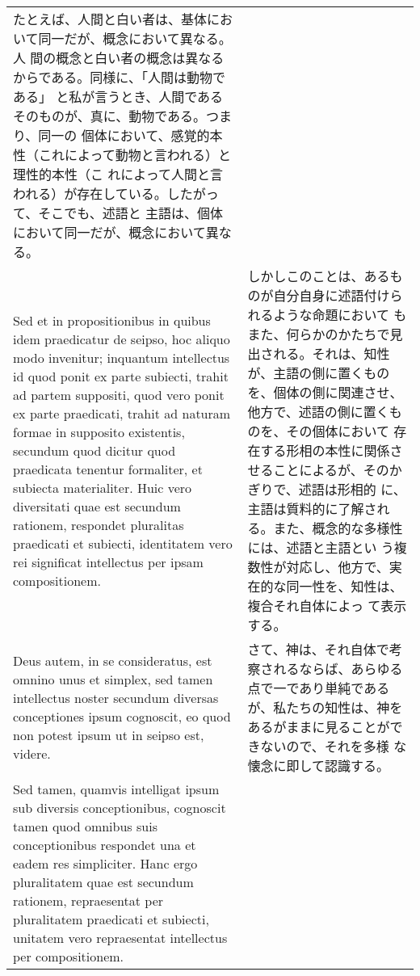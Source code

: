 \documentclass[10pt]{jsarticle} %
\begin{document}
\begin{longtable}{p{21em}p{21em}}
たとえば、人間と白い者は、基体において同一だが、概念において異なる。人
間の概念と白い者の概念は異なるからである。同様に、「人間は動物である」
と私が言うとき、人間であるそのものが、真に、動物である。つまり、同一の
個体において、感覚的本性（これによって動物と言われる）と理性的本性（こ
れによって人間と言われる）が存在している。したがって、そこでも、述語と
主語は、個体において同一だが、概念において異なる。

\\

Sed et in propositionibus in quibus idem praedicatur de seipso, hoc
aliquo modo invenitur; inquantum intellectus id quod ponit ex parte
subiecti, trahit ad partem suppositi, quod vero ponit ex parte
praedicati, trahit ad naturam formae in supposito existentis, secundum
quod dicitur quod praedicata tenentur formaliter, et subiecta
materialiter. Huic vero diversitati quae est secundum rationem,
respondet pluralitas praedicati et subiecti, identitatem vero rei
significat intellectus per ipsam compositionem.

&

しかしこのことは、あるものが自分自身に述語付けられるような命題において
もまた、何らかのかたちで見出される。それは、知性が、主語の側に置くもの
を、個体の側に関連させ、他方で、述語の側に置くものを、その個体において
存在する形相の本性に関係させることによるが、そのかぎりで、述語は形相的
に、主語は質料的に了解される。また、概念的な多様性には、述語と主語とい
う複数性が対応し、他方で、実在的な同一性を、知性は、複合それ自体によっ
て表示する。


\\


Deus autem, in se consideratus, est omnino unus et
simplex, sed tamen intellectus noster secundum diversas conceptiones
ipsum cognoscit, eo quod non potest ipsum ut in seipso est, videre. 

&

さて、神は、それ自体で考察されるならば、あらゆる点で一であり単純である
が、私たちの知性は、神をあるがままに見ることができないので、それを多様
な懐念に即して認識する。

\\

Sed
tamen, quamvis intelligat ipsum sub diversis conceptionibus, cognoscit
tamen quod omnibus suis conceptionibus respondet una et eadem res
simpliciter. Hanc ergo pluralitatem quae est secundum rationem,
repraesentat per pluralitatem praedicati et subiecti, unitatem vero
repraesentat intellectus per compositionem.



\end{longtable}
\end{document}
